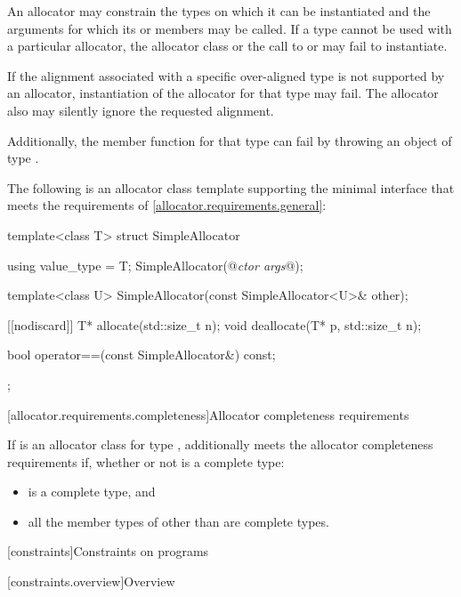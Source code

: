 \pnum
An allocator may constrain the types on which it can be instantiated and the
arguments for which its  or  members may be
called. If a type cannot be used with a particular allocator, the allocator
class or the call to  or  may fail to instantiate.

\pnum
If the alignment associated with a specific over-aligned type is not
supported by an allocator, instantiation of the allocator for that type may
fail. The allocator also may silently ignore the requested alignment.
\begin{note}
Additionally, the member function 
for that type can fail by throwing an object of type
.
\end{note}

\pnum
\begin{example}
The following is an allocator class template supporting the minimal
interface that meets the requirements of \ref{allocator.requirements.general}:

\begin{codeblock}
template<class T>
struct SimpleAllocator {
  using value_type = T;
  SimpleAllocator(@\textit{ctor args}@);

  template<class U> SimpleAllocator(const SimpleAllocator<U>& other);

  [[nodiscard]] T* allocate(std::size_t n);
  void deallocate(T* p, std::size_t n);

  bool operator==(const SimpleAllocator&) const;
};
\end{codeblock}
\end{example}

[allocator.requirements.completeness]{Allocator completeness requirements}

\pnum
If  is an allocator class for type ,
 additionally meets the allocator completeness requirements if,
whether or not  is a complete type:
\begin{itemize}
\item {} is a complete type, and
\item all the member types of 
  other than  are complete types.
\end{itemize}

[constraints]{Constraints on programs}

[constraints.overview]{Overview}


